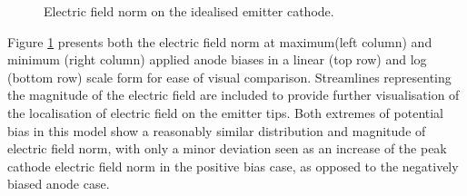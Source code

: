 \begin{refsection}
\begin{figure}[H]
    \caption{Electric field norm on the idealised emitter cathode.}
    \label{fig:electric_field_norm}
\end{figure}

Figure \ref{fig:electric_field_norm} presents both the electric field norm at maximum(left column) and minimum (right column) applied anode biases in a linear (top row) and log (bottom row) scale form for ease of visual comparison. Streamlines representing the magnitude of the electric field are included to provide further visualisation of the localisation of electric field on the emitter tips. Both extremes of potential bias in this model show a reasonably similar distribution and magnitude of electric field norm, with only a minor deviation seen as an increase of the peak cathode electric field norm in the positive bias case, as opposed to the negatively biased anode case. 


\end{refsection}
